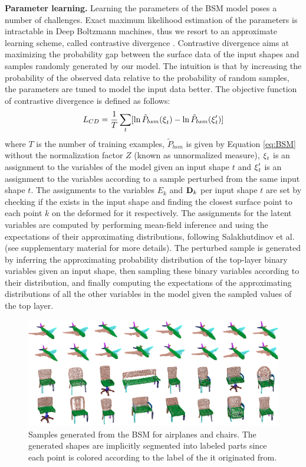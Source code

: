 \textbf{Parameter learning.} Learning  the parameters of the BSM model poses a number of challenges. Exact maximum likelihood estimation of the parameters is intractable in Deep Boltzmann machines, thus we resort to an approximate learning scheme, called contrastive divergence \cite{Koller09}. Contrastive divergence aims at maximizing the probability gap between the surface data of the input shapes and samples randomly generated by our model. The intuition is that by increasing the probability of the observed data relative to the probability of random samples, the parameters are tuned to model the input data better. The objective function of contrastive divergence is defined as follows: 
\begin{align*}
L_{CD} = \frac{1}{T} \sum\limits_t [ \ln \tilde{P}_{bsm}(\mbox{\relax$\xi$}_t) - \ln \tilde{P}_{bsm}(\mbox{\relax$\xi$}'_t) ]
\end{align*}
where $T$ is the number of training examples, $\tilde{P}_{bsm}$ is given by Equation \ref{eq:BSM} without the normalization factor $Z$ (known as unnormalized measure), $\mbox{\relax$\xi$}_t$ is an assignment to the variables of the model given an input shape $t$ and $\mbox{\relax$\xi$}'_t$ is an assignment to the variables according to a sample perturbed from the same input shape $t$. The assignments to the variables $E_k$ and $\mathbf{D}_k$ per input shape $t$ are set by checking if the  exists in the input shape and finding the closest surface point to each point $k$ on the deformed  for it respectively. The assignments for the latent variables are computed by performing mean-field inference and using the expectations of their approximating distributions, following Salakhutdinov et al. \cite{Salakhutdinov12} (see supplementary material for more details). The perturbed sample is generated by inferring the approximating probability distribution of the top-layer binary variables given an input shape, then sampling these binary variables according to their distribution, and finally computing the expectations of the approximating distributions of all the other variables in the model given the sampled values of the top layer. 


\begin{figure}[t!]
\centering
\includegraphics[width=0.99\columnwidth]{figures/bsm_sample}
\vskip -2mm
\caption{Samples generated from the BSM for airplanes and chairs. The generated shapes are implicitly segmented into labeled parts since each point is colored according to the label of the  it originated from.}
\vskip -8mm
\label{fig:sample_BSM}
\end{figure}


